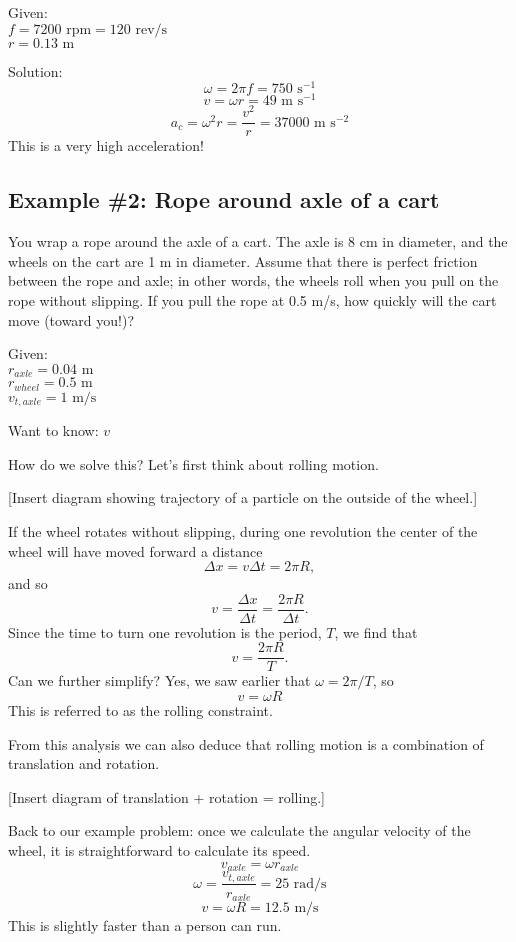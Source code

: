 Given:\\
$f=7200\mbox{ rpm}=120\mbox{ rev/s}$\\
$r=0.13\mbox{ m}$

Solution:\\
$$\omega=2\pi f=750\mbox{ s}^{-1}$$
$$v=\omega r = 49\mbox{ m s}^{-1}$$
$$a_c = \omega^2r = \frac{v^2}{r} = 37000\mbox{ m s}^{-2}$$
This is a very high acceleration!


\subsection{Example \#2: Rope around axle of a cart}
You wrap a rope around the axle of a cart. The axle is 8 cm in diameter, and the wheels on the cart are 1 m in diameter. Assume that there is perfect friction between the rope and axle; in other words, the wheels roll when you pull on the rope without slipping. If you pull the rope at 0.5 m/s, how quickly will the cart move (toward you!)? 

Given:\\
$r_{axle}=0.04\mbox{ m}$\\
$r_{wheel}=0.5\mbox{ m}$\\
$v_{t,axle}=1\mbox{ m/s}$

Want to know: $v$

How do we solve this? Let's first think about rolling motion.

[Insert diagram showing trajectory of a particle on the outside of the wheel.]
\vspace{5cm}

If the wheel rotates without slipping, during one revolution the center of the wheel will have moved forward a distance
$$\Delta x=v\Delta t=2\pi R,$$
and so
$$v=\frac{\Delta x}{\Delta t}=\frac{2\pi R}{\Delta t}.$$
Since the time to turn one revolution is the period, $T$, we find that
$$v=\frac{2\pi R}{T}.$$
Can we further simplify? Yes, we saw earlier that $\omega=2\pi/T$, so
$$\boxed{v=\omega R}$$
This is referred to as the rolling constraint.

From this analysis we can also deduce that rolling motion is a combination of translation and rotation.

[Insert diagram of translation + rotation = rolling.]
\vspace{5cm}

Back to our example problem: once we calculate the angular velocity of the wheel, it is straightforward to calculate its speed.
$$v_{axle}=\omega r_{axle}$$
$$\omega=\frac{v_{t,axle}}{r_{axle}}=25\mbox{ rad/s}$$
$$v=\omega R=12.5\mbox{ m/s}$$
This is slightly faster than a person can run.

\clearpage

